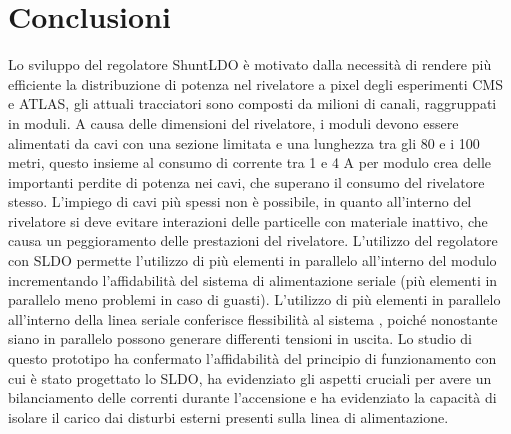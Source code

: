 \chapter{Conclusioni}


Lo sviluppo del regolatore ShuntLDO è motivato dalla necessità di rendere più efficiente la distribuzione di potenza nel rivelatore a pixel degli esperimenti CMS e ATLAS, gli attuali tracciatori sono composti da milioni di canali, raggruppati in moduli. 
A causa delle dimensioni del rivelatore, i moduli devono essere alimentati da cavi con una sezione limitata e una lunghezza tra gli 80 e i 100 metri, questo insieme al consumo di corrente tra 1 e 4 A per modulo crea delle importanti perdite di potenza nei cavi, che superano il consumo del rivelatore stesso. 
L'impiego di cavi più spessi non è possibile, in quanto all'interno del rivelatore si deve evitare interazioni delle particelle con materiale inattivo, che causa un peggioramento delle prestazioni del rivelatore. 
L'utilizzo del regolatore con SLDO permette l'utilizzo di più elementi in parallelo all'interno del modulo incrementando  l'affidabilità del sistema di alimentazione seriale (più elementi in parallelo meno problemi in caso di guasti). 
L'utilizzo di più elementi in parallelo all'interno della linea seriale conferisce  flessibilità al sistema , poiché nonostante siano in parallelo possono generare differenti tensioni in uscita. 
Lo studio di questo prototipo ha confermato l'affidabilità del principio di funzionamento con cui è stato progettato lo SLDO, ha evidenziato gli aspetti cruciali per avere un bilanciamento delle correnti durante l'accensione e ha evidenziato la capacità di isolare il carico dai disturbi esterni presenti sulla linea di alimentazione.
 





